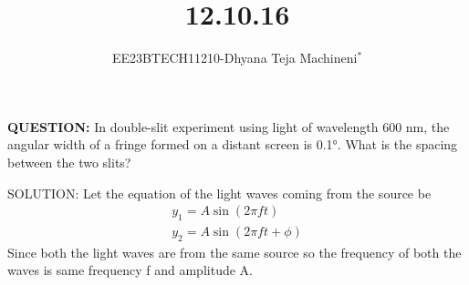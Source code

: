 \documentclass[journal,12pt,twocolumn]{IEEEtran}
\theoremstyle{remark}
\begin{document}

\vspace{3cm}
\title{\textbf{12.10.16}}
\author{EE23BTECH11210-Dhyana Teja Machineni$^{*}$%
}
\maketitle
\newpage
\bigskip

\textbf{QUESTION:}
In double-slit experiment using light of wavelength 600 nm, the
angular width of a fringe formed on a distant screen is 0.1°. What is
the spacing between the two slits?

SOLUTION:
Let the equation of the light waves coming from the source be
\begin{align}
y_1=A \sin(2\pi f t)\\
y_2=A \sin(2\pi f t+\phi)
\end{align}
Since both the light waves are from the same source so the frequency of both the waves is same frequency f and amplitude A.
\end{document}
